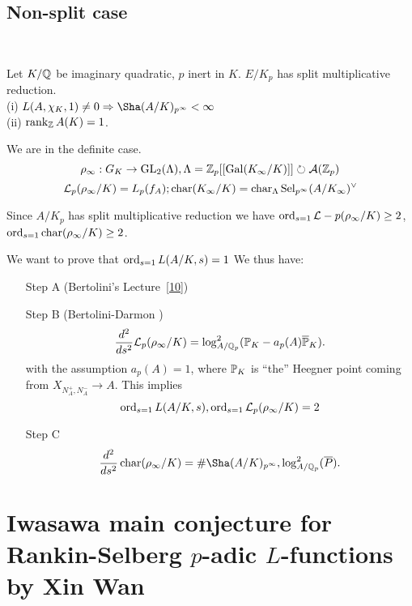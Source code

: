 \documentclass[12pt,amsfont]{amsart}
\begin{document}
\subsection{Non-split case}
{\ }

Let $K/{\mathbb Q}$ be imaginary quadratic, $p$ inert in $K$. $E/K_p$ has split multiplicative reduction. \\
(i) $L(A, \chi_K, 1) \ne 0 \Rightarrow \Sha(A/K)_{p^\infty} < \infty$ \\
(ii) $\operatorname{rank}_{\mathbb Z} A(K) = 1$.

\begin{rmk} We are in the definite case. 
\[\rho_\infty: G_K \rightarrow \operatorname{GL}_2(\Lambda), \Lambda = {\mathbb Z}_p[[\operatorname{Gal}(K_\infty/K)]] \circlearrowright \mathcal{A}({\mathbb Z}_p)\]
\[\mathcal{L}_p(\rho_\infty/K) = L_p(f_A); \operatorname{char}(K_\infty/K) = \operatorname{char}_\Lambda \operatorname{Sel}_{p^\infty}(A/K_\infty)^\vee\]
\end{rmk} 

\begin{rmk} Since $A/K_p$ has split multiplicative reduction we have $\operatorname{ord}_{s=1} \mathcal{L}-p(\rho_\infty/K) \geq 2$, $\operatorname{ord}_{s=1} \operatorname{char}(\rho_\infty/K) \geq 2$.
\end{rmk}

We want to prove that $\operatorname{ord}_{s=1} L(A/K, s) = 1$ We thus have:
\begin{enumerate}
\item[Step A]
(Bertolini's Lecture~\ref{10})
\item[Step B]
(Bertolini-Darmon ) 
\[
\displaystyle \frac{d^2}{ds^2} \mathcal{L}_p(\rho_\infty/K) = \log_{A/{\mathbb Q}_p}^2 (\mathbb{P}_K - a_p(A) \overline{\mathbb{P}}_K).
\]
with the assumption $a_p(A) = 1$, where $\mathbb{P}_K$ is ``the'' Heegner point coming from $X_{N_A^+, N_A^{-}} \rightarrow A$. This implies
\[\operatorname{ord}_{s=1} L(A/K, s), \operatorname{ord}_{s=1} \mathcal{L}_p(\rho_\infty/K) = 2 \] 
\item[Step C]
\[
\frac{d^2}{ds^2} \chr(\rho_\infty/K) = \# \Sha(A/K)_{p^\infty}, \log_{A/\bQ_p}^2(\ol{P}).
\]
\end{enumerate}
\renewcommand{\thesubsection}{\arabic{section}.R}
\begingroup
\renewcommand{\addcontentsline}[3]{}%
\endgroup

\newpage
\section{Iwasawa main conjecture for Rankin-Selberg $p$-adic $L$-functions\\ by Xin Wan }\label{14}
\renewcommand{\thesubsection}{\arabic{section}.\arabic{subsection}}
\end{document}
